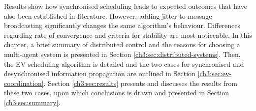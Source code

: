 Results show how synchronised scheduling leads to expected outcomes that have also been established in literature.
However, adding jitter to message broadcasting significantly changes the same algorithm's behaviour.
Differences regarding rate of convergence and criteria for stability are most noticeable.
In this chapter, a brief summary of distributed control and the reasons for choosing a multi-agent system is presented in Section \ref{ch3:sec:distributed-systems}.
Then, the EV scheduling algorithm is detailed and the two cases for synchronised and desynchronised information propagation are outlined in Section \ref{ch3:sec:ev-coordination}.
Section \ref{ch3:sec:results} presents and discusses the results from these two cases, upon which conclusions is drawn and presented in Section \ref{ch3:sec:summary}.












